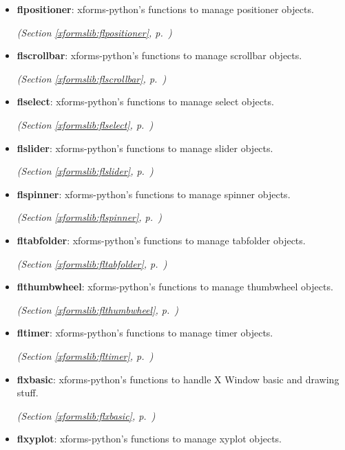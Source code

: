 \begin{itemize}
\item \textbf{flpositioner}: 
xforms-python's functions to manage positioner objects.


  \textit{(Section \ref{xformslib:flpositioner}, p.~\pageref{xformslib:flpositioner})}

\item \textbf{flscrollbar}: 
xforms-python's functions to manage scrollbar objects.


  \textit{(Section \ref{xformslib:flscrollbar}, p.~\pageref{xformslib:flscrollbar})}

\item \textbf{flselect}: 
xforms-python's functions to manage select objects.


  \textit{(Section \ref{xformslib:flselect}, p.~\pageref{xformslib:flselect})}

\item \textbf{flslider}: 
xforms-python's functions to manage slider objects.


  \textit{(Section \ref{xformslib:flslider}, p.~\pageref{xformslib:flslider})}

\item \textbf{flspinner}: 
xforms-python's functions to manage spinner objects.


  \textit{(Section \ref{xformslib:flspinner}, p.~\pageref{xformslib:flspinner})}

\item \textbf{fltabfolder}: 
xforms-python's functions to manage tabfolder objects.


  \textit{(Section \ref{xformslib:fltabfolder}, p.~\pageref{xformslib:fltabfolder})}

\item \textbf{flthumbwheel}: 
xforms-python's functions to manage thumbwheel objects.


  \textit{(Section \ref{xformslib:flthumbwheel}, p.~\pageref{xformslib:flthumbwheel})}

\item \textbf{fltimer}: 
xforms-python's functions to manage timer objects.


  \textit{(Section \ref{xformslib:fltimer}, p.~\pageref{xformslib:fltimer})}

\item \textbf{flxbasic}: 
xforms-python's functions to handle X Window basic and drawing stuff.


  \textit{(Section \ref{xformslib:flxbasic}, p.~\pageref{xformslib:flxbasic})}

\item \textbf{flxyplot}: 
xforms-python's functions to manage xyplot objects.



\end{itemize}
